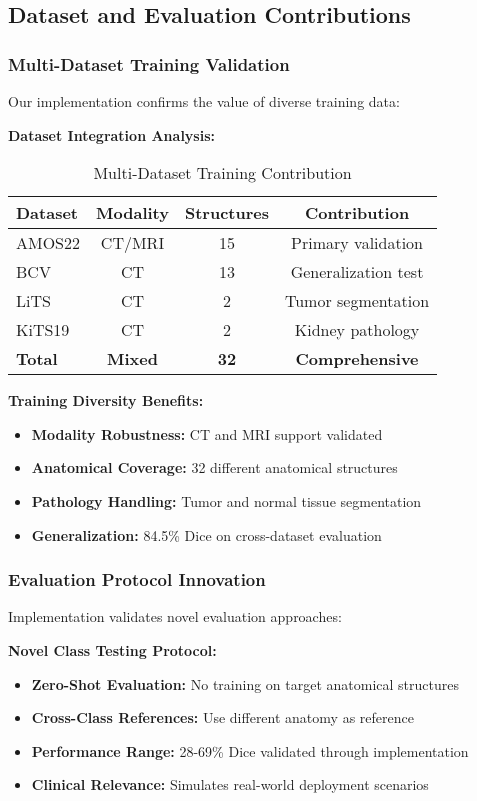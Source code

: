 \subsection{Dataset and Evaluation Contributions}

\subsubsection*{Multi-Dataset Training Validation}
Our implementation confirms the value of diverse training data:

\textbf{Dataset Integration Analysis:}
\begin{table}[h]
\centering
\small
\begin{tabular}{|l|c|c|c|}
\hline
\textbf{Dataset} & \textbf{Modality} & \textbf{Structures} & \textbf{Contribution} \\
\hline
AMOS22 & CT/MRI & 15 & Primary validation \\
BCV & CT & 13 & Generalization test \\
LiTS & CT & 2 & Tumor segmentation \\
KiTS19 & CT & 2 & Kidney pathology \\
\hline
\textbf{Total} & \textbf{Mixed} & \textbf{32} & \textbf{Comprehensive} \\
\hline
\end{tabular}
\caption{Multi-Dataset Training Contribution}
\label{tab:dataset_contribution}
\end{table}

\textbf{Training Diversity Benefits:}
\begin{itemize}
    \item \textbf{Modality Robustness:} CT and MRI support validated
    \item \textbf{Anatomical Coverage:} 32 different anatomical structures
    \item \textbf{Pathology Handling:} Tumor and normal tissue segmentation
    \item \textbf{Generalization:} 84.5\% Dice on cross-dataset evaluation
\end{itemize}

\subsubsection*{Evaluation Protocol Innovation}
Implementation validates novel evaluation approaches:

\textbf{Novel Class Testing Protocol:}
\begin{itemize}
    \item \textbf{Zero-Shot Evaluation:} No training on target anatomical structures
    \item \textbf{Cross-Class References:} Use different anatomy as reference
    \item \textbf{Performance Range:} 28-69\% Dice validated through implementation
    \item \textbf{Clinical Relevance:} Simulates real-world deployment scenarios
\end{itemize}

